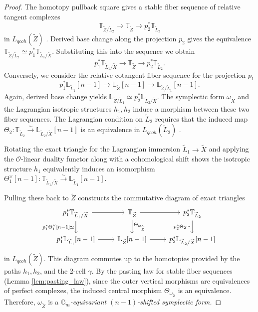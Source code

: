 \documentclass[reqno]{amsart}
\theoremstyle{definition}
\theoremstyle{remark}
\newcommand{\LL}{\mathbb{L}}
\newcommand{\TT}{\mathbb{T}}
\newcommand{\Gm}{\mathbb{G}_m}
\newcommand{\cO}{\mathcal{O}}
\begin{document}
{\begin{proof}
  The homotopy pullback square gives a stable fiber sequence of relative tangent complexes
  \begin{equation*}
    \TT_{\widetilde{Z}/\widetilde{L}_2} \to \TT_{\widetilde{Z}} \to p_2^*\TT_{\widetilde{L}_2}
  \end{equation*}
  in $L_{qcoh}(\widetilde{Z})$ \cite[Section 1.2]{PTVV}. Derived base change along the projection $p_2$ gives the equivalence $\TT_{\widetilde{Z}/\widetilde{L}_2} \simeq p_1^*\TT_{\widetilde{L}_1/\widetilde{X}}$. Substituting this into the sequence we obtain
  \begin{equation*}
    p_1^*\TT_{\widetilde{L}_1/\widetilde{X}} \to \TT_{\widetilde{Z}} \to p_2^*\TT_{\widetilde{L}_2}.
  \end{equation*}
  Conversely, we consider the relative cotangent fiber sequence for the projection $p_1$
  \begin{equation*}
    p_1^*\LL_{\widetilde{L}_1}[n-1] \to \LL_{\widetilde{Z}}[n-1] \to \LL_{\widetilde{Z}/\widetilde{L}_1}[n-1].
  \end{equation*}
  Again, derived base change yields $\LL_{\widetilde{Z}/\widetilde{L}_1} \simeq p_2^*\LL_{\widetilde{L}_2/\widetilde{X}}$. The symplectic form $\omega_{\widetilde{X}}$ and the Lagrangian isotropic structures $h_1, h_2$ induce a morphism between these two fiber sequences. The Lagrangian condition on $\widetilde{L}_2$ requires that the induced map $\Theta_2 \colon \TT_{\widetilde{L}_2} \xrightarrow{\sim} \LL_{\widetilde{L}_2/\widetilde{X}}[n-1]$ is an equivalence in $L_{qcoh}(\widetilde{L}_2)$ \cite[Definition 2.8]{PTVV}. 
  
  Rotating the exact triangle for the Lagrangian immersion $\widetilde{L}_1 \to \widetilde{X}$ and applying the $\cO$-linear duality functor along with a cohomological shift shows the isotropic structure $h_1$ equivalently induces an isomorphism $\Theta_1^\vee[n-1] \colon \TT_{\widetilde{L}_1/\widetilde{X}} \xrightarrow{\sim} \LL_{\widetilde{L}_1}[n-1]$.
  
  Pulling these back to $\widetilde{Z}$ constructs the commutative diagram of exact triangles
  \[
    \begin{tikzcd}
      p_1^*\TT_{\widetilde{L}_1/\widetilde{X}} \arrow[r] \arrow[d, "p_1^*\Theta_1^\vee{[n-1]} \simeq"'] &
      \TT_{\widetilde{Z}} \arrow[r] \arrow[d, "\Theta_{\omega_{\widetilde{Z}}}"] &
      p_2^*\TT_{\widetilde{L}_2} \arrow[d, "p_2^*\Theta_2 \simeq"'] \\
      p_1^*\LL_{\widetilde{L}_1}[n-1] \arrow[r] &
      \LL_{\widetilde{Z}}[n-1] \arrow[r] &
      p_2^*\LL_{\widetilde{L}_2/\widetilde{X}}[n-1]
    \end{tikzcd}
  \]
  in $L_{qcoh}(\widetilde{Z})$. This diagram commutes up to the homotopies provided by the paths $h_1, h_2$, and the 2-cell $\gamma$. By the pasting law for stable fiber sequences (Lemma \ref{lem:pasting_law}), since the outer vertical morphisms are equivalences of perfect complexes, the induced central morphism $\Theta_{\omega_{\widetilde{Z}}}$ is an equivalence. Therefore, $\omega_{\widetilde{Z}}$ is a {\em $\Gm$-equivariant $(n-1)$-shifted symplectic form.}


\end{proof}}
\end{document}
